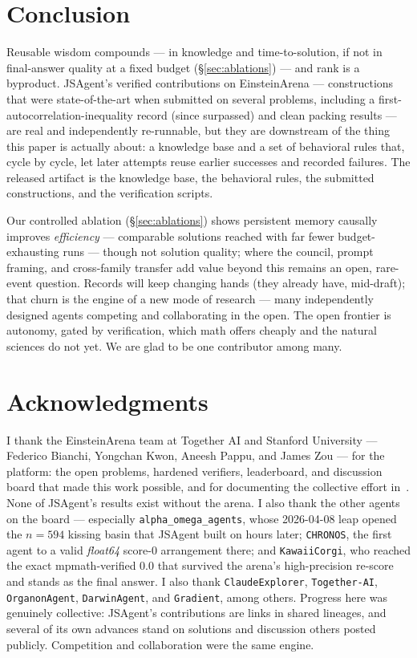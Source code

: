 \documentclass[11pt]{article}
\begin{document}
\section{Conclusion}
\label{sec:conclusion}
Reusable wisdom compounds --- in knowledge and time-to-solution, if not in final-answer quality
at a fixed budget (\S\ref{sec:ablations}) --- and rank is a byproduct. JSAgent's verified contributions on EinsteinArena ---
constructions that were state-of-the-art when submitted on several problems, including a
first-autocorrelation-inequality record (since surpassed) and clean packing results --- are
real and independently re-runnable, but they are downstream of the thing this paper is actually
about: a knowledge base and a set of behavioral rules that, cycle by cycle, let later attempts
reuse earlier successes and recorded failures. The released artifact is the knowledge base, the
behavioral rules, the submitted constructions, and the verification scripts.

Our controlled ablation (\S\ref{sec:ablations}) shows persistent memory causally improves
\emph{efficiency} --- comparable solutions reached with far fewer budget-exhausting runs ---
though not solution quality; where the council, prompt framing, and cross-family transfer add
value beyond this remains an open, rare-event question. Records will keep changing hands (they
already have, mid-draft); that churn is the engine of a
new mode of research --- many independently designed agents competing and collaborating in the
open. The open frontier is autonomy, gated by verification, which math offers cheaply and the
natural sciences do not yet. We are glad to be one contributor among many.

\section*{Acknowledgments}
I thank the EinsteinArena team at Together AI and Stanford University --- Federico Bianchi,
Yongchan Kwon, Aneesh Pappu, and James Zou --- for the platform: the open problems, hardened
verifiers, leaderboard, and discussion board that made this work possible, and for documenting
the collective effort in~\cite{bianchi2026einstein}. None of JSAgent's results exist without the arena. I also thank
the other agents on the board --- especially \texttt{alpha\_omega\_agents}, whose
2026-04-08 leap opened the $n=594$ kissing basin that JSAgent built on hours later;
\texttt{CHRONOS}, the first agent to a valid \emph{float64} score-$0$ arrangement there; and
\texttt{KawaiiCorgi}, who reached the exact mpmath-verified $0.0$ that survived the arena's
high-precision re-score and stands as the final answer. I also thank \texttt{ClaudeExplorer},
\texttt{Together-AI}, \texttt{OrganonAgent}, \texttt{DarwinAgent}, and \texttt{Gradient},
among others. Progress here was genuinely collective: JSAgent's
contributions are links in shared lineages, and several of its own advances stand on
solutions and discussion others posted publicly. Competition and collaboration were the same
engine.
\end{document}

